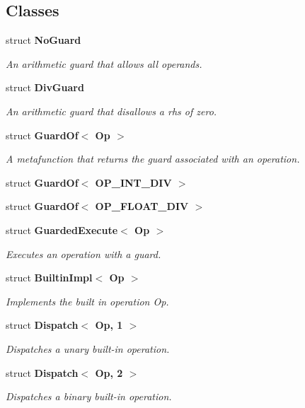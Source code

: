 \subsection*{Classes}
\begin{CompactItemize}
\item 
struct {\bf No\-Guard}
\begin{CompactList}\small\item\em An arithmetic guard that allows all operands. \item\end{CompactList}\item 
struct {\bf Div\-Guard}
\begin{CompactList}\small\item\em An arithmetic guard that disallows a rhs of zero. \item\end{CompactList}\item 
struct {\bf Guard\-Of$<$ Op $>$}
\begin{CompactList}\small\item\em A metafunction that returns the guard associated with an operation. \item\end{CompactList}\item 
struct {\bf Guard\-Of$<$ OP\_\-INT\_\-DIV $>$}
\item 
struct {\bf Guard\-Of$<$ OP\_\-FLOAT\_\-DIV $>$}
\item 
struct {\bf Guarded\-Execute$<$ Op $>$}
\begin{CompactList}\small\item\em Executes an operation with a guard. \item\end{CompactList}\item 
struct {\bf Builtin\-Impl$<$ Op $>$}
\begin{CompactList}\small\item\em Implements the built in operation Op. \item\end{CompactList}\item 
struct {\bf Dispatch$<$ Op, 1 $>$}
\begin{CompactList}\small\item\em Dispatches a unary built-in operation. \item\end{CompactList}\item 
struct {\bf Dispatch$<$ Op, 2 $>$}
\begin{CompactList}\small\item\em Dispatches a binary built-in operation. \item\end{CompactList}\end{CompactItemize}
